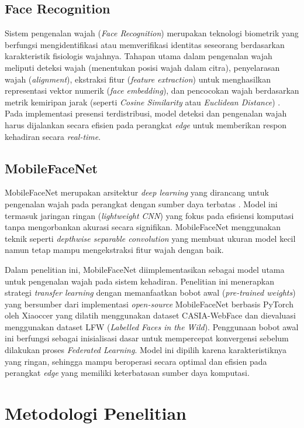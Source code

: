 \documentclass[conference]{IEEEtran}
\begin{document}
\subsection{Face Recognition}
Sistem pengenalan wajah (\textit{Face Recognition}) merupakan teknologi biometrik yang berfungsi mengidentifikasi atau memverifikasi identitas seseorang berdasarkan karakteristik fisiologis wajahnya. Tahapan utama dalam pengenalan wajah meliputi deteksi wajah (menentukan posisi wajah dalam citra), penyelarasan wajah (\textit{alignment}), ekstraksi fitur (\textit{feature extraction}) untuk menghasilkan representasi vektor numerik (\textit{face embedding}), dan pencocokan wajah berdasarkan metrik kemiripan jarak (seperti \textit{Cosine Similarity} atau \textit{Euclidean Distance}) \cite{b5}. Pada implementasi presensi terdistribusi, model deteksi dan pengenalan wajah harus dijalankan secara efisien pada perangkat \textit{edge} untuk memberikan respon kehadiran secara \textit{real-time}.

\subsection{MobileFaceNet}
MobileFaceNet merupakan arsitektur \textit{deep learning} yang dirancang untuk pengenalan wajah pada perangkat dengan sumber daya terbatas \cite{b9}. Model ini termasuk jaringan ringan (\textit{lightweight CNN}) yang fokus pada efisiensi komputasi tanpa mengorbankan akurasi secara signifikan. MobileFaceNet menggunakan teknik seperti \textit{depthwise separable convolution} yang membuat ukuran model kecil namun tetap mampu mengekstraksi fitur wajah dengan baik.

Dalam penelitian ini, MobileFaceNet diimplementasikan sebagai model utama untuk pengenalan wajah pada sistem kehadiran. Penelitian ini menerapkan strategi \textit{transfer learning} dengan memanfaatkan bobot awal (\textit{pre-trained weights}) yang bersumber dari implementasi \textit{open-source} MobileFaceNet berbasis PyTorch oleh Xiaoccer \cite{b10} yang dilatih menggunakan dataset CASIA-WebFace dan dievaluasi menggunakan dataset LFW (\textit{Labelled Faces in the Wild}). Penggunaan bobot awal ini berfungsi sebagai inisialisasi dasar untuk mempercepat konvergensi sebelum dilakukan proses \textit{Federated Learning}. Model ini dipilih karena karakteristiknya yang ringan, sehingga mampu beroperasi secara optimal dan efisien pada perangkat \textit{edge} yang memiliki keterbatasan sumber daya komputasi.

\section{Metodologi Penelitian}
\end{document}

